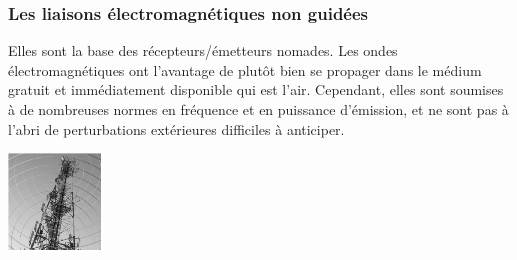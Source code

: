\documentclass[10pt]{article}
\begin{document}
\subsubsection*{Les liaisons électromagnétiques non guidées}
\begin{minipage}[c]{.78\linewidth}
Elles sont la base des récepteurs/émetteurs nomades. Les ondes électromagnétiques ont l’avantage de plutôt bien se propager dans le médium gratuit et immédiatement disponible qui est l’air. Cependant, elles sont soumises à de nombreuses normes en fréquence et en puissance d’émission, et ne sont pas à l’abri de perturbations extérieures difficiles à anticiper.
\end{minipage} \hfill
\begin{minipage}[c]{.2\linewidth}
\begin{center}
\includegraphics[width=.95\textwidth]{images/fig_11}
\end{center}
\end{minipage} 
\end{document}
